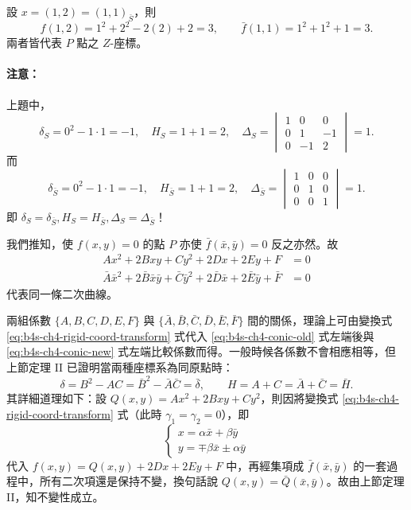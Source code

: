 設 $x = (1, 2) = (1, 1)_{\bar{S}}$，則
\[
f(1, 2) = 1^2 + 2^2 - 2(2) + 2 = 3, \qquad
\bar{f}(1, 1) = 1^2 + 1^2 + 1 = 3.
\]
兩者皆代表 $P$ 點之 $Z$-座標。

\paragraph{注意：}
上題中，
\[
\delta_S = 0^2 - 1 \cdot 1 = -1, \quad H_S = 1 + 1 = 2, \quad \Delta_S = \begin{vmatrix} 1 & 0 & 0 \\ 0 & 1 & -1 \\ 0 & -1 & 2 \end{vmatrix} = 1.
\]
而
\[
\delta_{\bar{S}} = 0^2 - 1 \cdot 1 = -1, \quad H_{\bar{S}} = 1 + 1 = 2, \quad \Delta_{\bar{S}} = \begin{vmatrix} 1 & 0 & 0 \\ 0 & 1 & 0 \\ 0 & 0 & 1 \end{vmatrix} = 1.
\]
即 $\delta_S = \delta_{\bar{S}}, H_S = H_{\bar{S}}, \Delta_S = \Delta_{\bar{S}}$！

我們推知，使 $f(x, y) = 0$ 的點 $P$ 亦使 $\bar{f}(\bar{x}, \bar{y}) = 0$ 反之亦然。故
\begin{align}
Ax^2 + 2Bxy + Cy^2 + 2Dx + 2Ey + F &= 0 \label{eq:b4s-ch4-conic-old} \\
\bar{A}\bar{x}^2 + 2\bar{B}\bar{x}\bar{y} + \bar{C}\bar{y}^2 + 2\bar{D}\bar{x} + 2\bar{E}\bar{y} + \bar{F} &= 0 \label{eq:b4s-ch4-conic-new}
\end{align}
代表同一條二次曲線。

兩組係數 $\{A, B, C, D, E, F\}$ 與 $\{\bar{A}, \bar{B}, \bar{C}, \bar{D}, \bar{E}, \bar{F}\}$ 間的關係，理論上可由變換式 \eqref{eq:b4s-ch4-rigid-coord-transform} 式代入 \eqref{eq:b4s-ch4-conic-old} 式左端後與 \eqref{eq:b4s-ch4-conic-new} 式左端比較係數而得。一般時候各係數不會相應相等，但上節定理 II 已證明當兩種座標系為同原點時：
\[
\delta = B^2 - AC = \bar{B}^2 - \bar{A}\bar{C} = \bar{\delta}, \qquad
H = A + C = \bar{A} + \bar{C} = \bar{H}.
\]
其詳細道理如下：設 $Q(x, y) = Ax^2 + 2Bxy + Cy^2$，則因將變換式 \eqref{eq:b4s-ch4-rigid-coord-transform} 式（此時 $\gamma_1 = \gamma_2 = 0$），即
\[
\begin{cases}
x = \alpha \bar{x} + \beta \bar{y} \\
y = \mp \beta \bar{x} \pm \alpha \bar{y}
\end{cases}
\]
代入 $f(x, y) = Q(x, y) + 2Dx + 2Ey + F$ 中，再經集項成 $\bar{f}(\bar{x}, \bar{y})$ 的一套過程中，所有二次項還是保持不變，換句話說 $Q(x, y) = \bar{Q}(\bar{x}, \bar{y})$。故由上節定理 II，知不變性成立。

